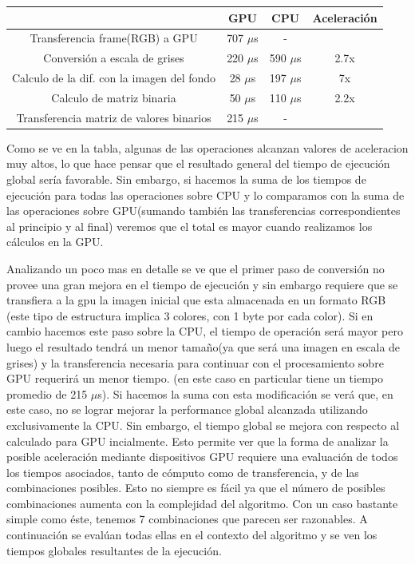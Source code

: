\documentclass[a4paper,10pt]{report}
\begin{document}
\begin{center}
    \begin{tabular}{ c | c | c | c }
    \hline
    & GPU & CPU & Aceleración\\ \hline
    Transferencia frame(RGB) a GPU & 707 $\mu$s &  - \\ \hline
    Conversión a escala de grises & 220 $\mu$s & 590 $\mu$s & 2.7x \\ \hline
    Calculo de la dif. con la imagen del fondo & 28 $\mu$s & 197 $\mu$s & 7x\\ \hline
    Calculo de matriz binaria & 50 $\mu$s & 110 $\mu$s & 2.2x\\ \hline
    Transferencia matriz de valores binarios & 215 $\mu$s & -  \\ \hline
    \end{tabular}
\end{center}


Como se ve en la tabla, algunas de las operaciones alcanzan valores de aceleracion muy altos, lo que hace pensar que el resultado general del tiempo de ejecución global sería favorable.
Sin embargo, si hacemos la suma de los tiempos de ejecución para todas las operaciones sobre CPU y lo comparamos con la suma de las operaciones sobre GPU(sumando también las transferencias correspondientes al principio y al final) veremos que el total es mayor cuando realizamos los cálculos en la GPU.

Analizando un poco mas en detalle se ve que el primer paso de conversión no provee una gran mejora en el tiempo de ejecución y sin embargo requiere que se transfiera a la gpu la imagen inicial
que esta almacenada en un formato RGB (este tipo de estructura implica 3 colores, con 1 byte por cada color). 
Si en cambio hacemos este paso sobre la CPU, el tiempo de operación será mayor pero luego el resultado tendrá un menor tamaño(ya que será una imagen en escala de grises) y la transferencia necesaria para continuar con el procesamiento sobre GPU requerirá un menor tiempo.
(en este caso en particular tiene un tiempo promedio de 215 $\mu$s). Si hacemos la suma con esta modificación se verá que, en este caso, no se lograr mejorar la performance global alcanzada utilizando exclusivamente la CPU. 
Sin embargo, el tiempo global se mejora con respecto al calculado para GPU incialmente. Esto permite ver que la forma de analizar la posible aceleración mediante dispositivos GPU requiere una evaluación de todos los tiempos asociados, tanto de cómputo como de transferencia, y de las combinaciones posibles.
Esto no siempre es fácil ya que el número de posibles combinaciones aumenta con la complejidad del algoritmo.
Con un caso bastante simple como éste, tenemos 7 combinaciones que parecen ser razonables. 
A continuación se evalúan todas ellas en el contexto del algoritmo y se ven los tiempos globales resultantes de la ejecución.
\end{document}
